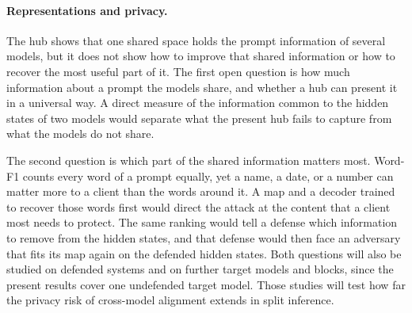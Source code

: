 \paragraph{Representations and privacy.} The hub shows that one shared space holds the prompt information of several models, but it does not show how to improve that shared information or how to recover the most useful part of it.
The first open question is how much information about a prompt the models share, and whether a hub can present it in a universal way.
A direct measure of the information common to the hidden states of two models would separate what the present hub fails to capture from what the models do not share.

The second question is which part of the shared information matters most.
Word-F1 counts every word of a prompt equally, yet a name, a date, or a number can matter more to a client than the words around it.
A map and a decoder trained to recover those words first would direct the attack at the content that a client most needs to protect.
The same ranking would tell a defense which information to remove from the hidden states, and that defense would then face an adversary that fits its map again on the defended hidden states.
Both questions will also be studied on defended systems and on further target models and blocks, since the present results cover one undefended target model.
Those studies will test how far the privacy risk of cross-model alignment extends in split inference.